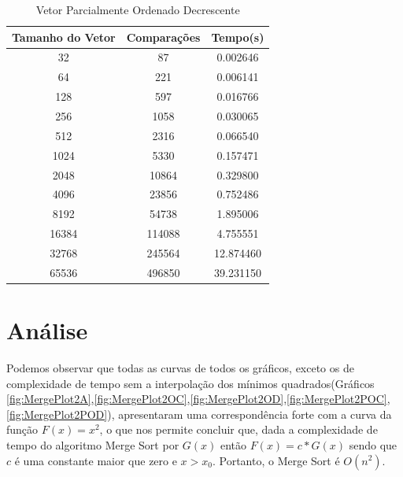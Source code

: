 \documentclass[12pt,a4paper,twoside]{report}
\begin{document}
\begin{table}[h]
  \centering
  \caption{Vetor Parcialmente Ordenado Decrescente \label{tab:pod}}
  \begin{tabular}{ccc} \\\hline
  \textbf{Tamanho do Vetor} & \textbf{Comparações} & \textbf{Tempo(s)} \\\hline
  32                        & 87                   & 0.002646          \\\hline
  64                        & 221                  & 0.006141          \\\hline
  128                       & 597                  & 0.016766          \\\hline
  256                       & 1058                 & 0.030065          \\\hline
  512                       & 2316                 & 0.066540          \\\hline
  1024                      & 5330                 & 0.157471          \\\hline
  2048                      & 10864                & 0.329800          \\\hline
  4096                      & 23856                & 0.752486         \\\hline
  8192                      & 54738                & 1.895006        \\\hline
  16384                     & 114088               & 4.755551        \\\hline
  32768                     & 245564               & 12.874460        \\\hline
  65536                     & 496850               & 39.231150        \\\hline
  \end{tabular}
\end{table}


\chapter{Análise}

Podemos observar que todas as curvas de todos os gráficos, exceto os de complexidade de tempo sem a interpolação dos mínimos quadrados(Gráficos \ref{fig:MergePlot2A},\ref{fig:MergePlot2OC},\ref{fig:MergePlot2OD},\ref{fig:MergePlot2POC},\ref{fig:MergePlot2POD}), apresentaram uma correspondência forte com a curva da função $F(x) = x^2$, o que nos permite concluir que, dada a complexidade de tempo do algoritmo Merge Sort por $G(x)$ então $F(x) = c * G(x)$ sendo que $c$ é uma constante maior que zero e $x > x_0$. Portanto, o Merge Sort é $O(n^2)$.
\end{document}

